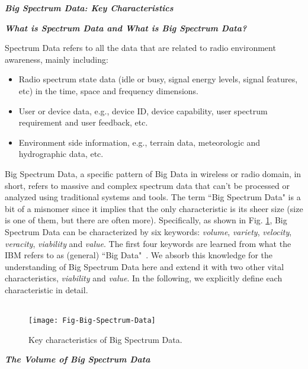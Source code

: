 \documentclass[12pt,draftcls,journal,letterpaper,oneside,onecolumn]{IEEEtran}
\begin{document}
\textbf{\emph{Big Spectrum Data: Key Characteristics}}

\textbf{\emph{What is Spectrum Data and What is Big Spectrum Data?}}

Spectrum Data refers to all the data that are related to radio environment awareness, mainly including:
\begin{itemize}
  \item Radio spectrum state data (idle or busy, signal energy levels, signal features, etc) in the time, space and frequency dimensions.
  \item User or device data, e.g., device ID, device capability, user spectrum requirement and user feedback, etc.
  \item Environment side information, e.g., terrain data, meteorologic and hydrographic data, etc.
\end{itemize}

Big Spectrum Data, a specific pattern of Big Data in wireless or radio domain, in short, refers to massive and complex spectrum data that can't be processed or analyzed using traditional systems and tools. The term ``Big Spectrum Data" is a bit of a misnomer since it implies that the only characteristic is its sheer size (size is one of them, but there are often more). Specifically, as shown in Fig. \ref{Fig-Big-Spectrum-Data}, Big Spectrum Data can be characterized by six keywords: \emph{volume}, \emph{variety}, \emph{velocity}, \emph{veracity}, \emph{viability} and \emph{value}. The first four keywords are learned from what the IBM refers to as (general) ``Big Data"~\cite{IBM-real-world-use}. We absorb this knowledge for the understanding of Big Spectrum Data here and extend it with two other vital characteristics, \emph{viability} and \emph{value}. In the following, we explicitly define each characteristic in detail.
\\
\\

\begin{figure}[!b]
\centering
\texttt{[image: Fig-Big-Spectrum-Data]}
\caption{Key characteristics of Big Spectrum Data.}
\label{Fig-Big-Spectrum-Data}
\end{figure}


\textbf{\emph{The Volume of Big Spectrum Data}}
\end{document}
